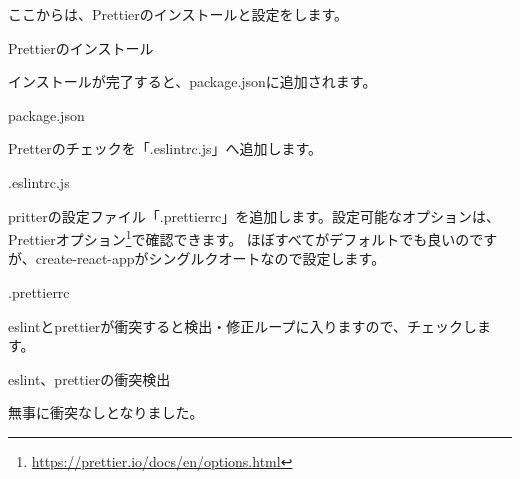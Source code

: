 ここからは、Prettierのインストールと設定をします。

\def\startercodeblockfontsize{}
\begin{starterterminal}[]{Prettierのインストール}\end{starterterminal}

インストールが完了すると、package.jsonに追加されます。

\def\startercodeblockfontsize{}
\begin{starterprogram}[]{package.json}\end{starterprogram}

Pretterのチェックを「.eslintrc.js」へ追加します。

\def\startercodeblockfontsize{}
\begin{starterprogram}[]{.eslintrc.js}\end{starterprogram}

pritterの設定ファイル「.prettierrc」を追加します。設定可能なオプションは、
Prettierオプション\footnote{\url{https://prettier.io/docs/en/options.html}}で確認できます。
ほぼすべてがデフォルトでも良いのですが、create{-}react{-}appがシングルクオートなので設定します。

\def\startercodeblockfontsize{}
\begin{starterprogram}[]{.prettierrc}\end{starterprogram}

eslintとprettierが衝突すると検出・修正ループに入りますので、チェックします。

\def\startercodeblockfontsize{}
\begin{starterterminal}[]{eslint、prettierの衝突検出}\end{starterterminal}

無事に衝突なしとなりました。

